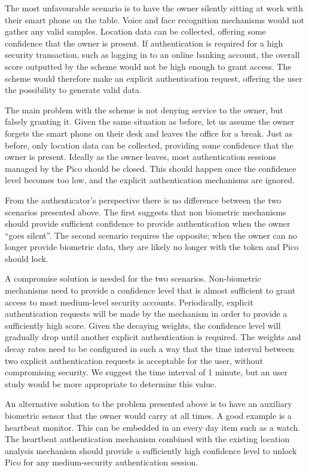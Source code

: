 The most unfavourable scenario is to have the owner silently sitting at work with their smart phone on the table. Voice and face recognition mechanisms would not gather any valid samples. Location data can be collected, offering some confidence that the owner is present. If authentication is required for a high security transaction, such as logging in to an online banking account, the overall score outputted by the scheme would not be high enough to grant access. The scheme would therefore make an explicit authentication request, offering the user the possibility to generate valid data.

The main problem with the scheme is not denying service to the owner, but falsely granting it. Given the same situation as before, let us assume the owner forgets the smart phone on their desk and leaves the office for a break. Just as before, only location data can be collected, providing some confidence that the owner is present. Ideally as the owner leaves, most authentication sessions managed by the Pico should be closed. This should happen once the confidence level becomes too low, and the explicit authentication mechanisms are ignored.

From the authenticator's perspective there is no difference between the two scenarios presented above. The first suggests that non biometric mechanisms should provide sufficient confidence to provide authentication when the owner ``goes silent''. The second scenario requires the opposite; when the owner can no longer provide biometric data, they are likely no longer with the token and Pico should lock. 

A compromise solution is needed for the two scenarios. Non-biometric mechanisms need to provide a confidence level that is almost sufficient to grant access to most medium-level security accounts. Periodically, explicit authentication requests will be made by the mechanism in order to provide a sufficiently high score. Given the decaying weights, the confidence level will gradually drop until another explicit authentication is required. The weights and decay rates need to be configured in such a way that the time interval between two explicit authentication requests is acceptable for the user, without compromising security. We suggest the time interval of 1 minute, but an user study would be more appropriate to determine this value.

An alternative solution to the problem presented above is to have an auxiliary biometric sensor that the owner would carry at all times. A good example is a heartbeat monitor. This can be embedded in an every day item such as a watch. The heartbeat authentication mechanism combined with the existing location analysis mechanism should provide a sufficiently high confidence level to unlock Pico for any medium-security authentication session.

